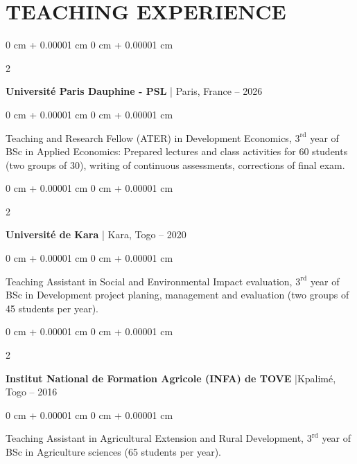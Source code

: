 \documentclass[10 pt, letterpaper]{article}
\newenvironment{onecolentry}{
    \begin{adjustwidth}{
        0 cm + 0.00001 cm
    }{
        0 cm + 0.00001 cm
    }
}{
    \end{adjustwidth}
} %
\newenvironment{twocolentry}[2][]{
    \onecolentry
    \def\secondColumn{#2}
    \setcolumnwidth{\fill, 4.5 cm}
    \begin{paracol}{2}
}{
    \switchcolumn \raggedleft \secondColumn
    \end{paracol}
    \endonecolentry
} %
\begin{document}
    \section{TEACHING EXPERIENCE}

        \begin{twocolentry}{
            2025 – 2026
        }
            \textbf{Université Paris Dauphine - PSL} | Paris, France \end{twocolentry}

        \vspace{0.10 cm}
        \begin{onecolentry}
                Teaching and Research Fellow (ATER) in Development Economics, $3^{\text{rd}}$ year of BSc in Applied Economics: Prepared lectures and class activities for 60 students (two groups of 30), writing of continuous assessments, corrections of final exam.
        \end{onecolentry}

        \vspace{0.20 cm}

        \begin{twocolentry}{
            2018 – 2020
        }
            \textbf{Université de Kara} | Kara, Togo \end{twocolentry}

        \vspace{0.10 cm}
        \begin{onecolentry}
                Teaching Assistant in Social and Environmental Impact evaluation, $3^{\text{rd}}$ year of BSc in Development project planing, management and evaluation (two groups of 45 students per year).
        \end{onecolentry}

        \vspace{0.20 cm}        
        \begin{twocolentry}{
            2012 – 2016
        }
            \textbf{Institut National de Formation Agricole (INFA) de TOVE} |Kpalimé, Togo\end{twocolentry}

        \vspace{0.10 cm}
        \begin{onecolentry}
                Teaching Assistant in Agricultural Extension and Rural Development, $3^{\text{rd}}$ year of BSc in Agriculture sciences (65 students per year).
        \end{onecolentry}

        \vspace{0.20 cm}
\end{document}
